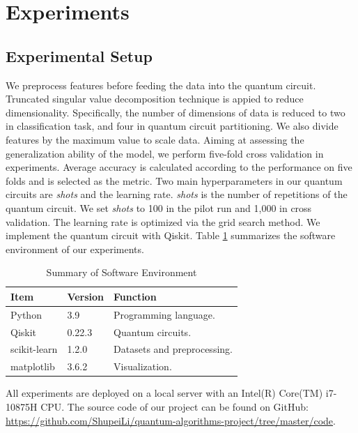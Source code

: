 \documentclass[sigconf]{acmart}
\begin{document}

\section{Experiments}
\subsection{Experimental Setup}
We preprocess features before feeding the data into the quantum circuit. Truncated singular value decomposition technique is appied to reduce dimensionality. Specifically, the number of dimensions of data is reduced to two in classification task, and four in quantum circuit partitioning. We also divide features by the maximum value to scale data. Aiming at assessing the generalization ability of the model, we perform five-fold cross validation in experiments. Average accuracy is calculated according to the performance on five folds and is selected as the metric. Two main hyperparameters in our quantum circuits are \textit{shots} and the learning rate. \textit{shots} is the number of repetitions of the quantum circuit. We set \textit{shots} to 100 in the pilot run and 1,000 in cross validation. The learning rate is optimized via the grid search method. We implement the quantum circuit with Qiskit. Table \ref{tab:software} summarizes the software environment of our experiments.

\begin{table}[!ht]
    \centering
    \caption{Summary of Software Environment}
    \label{tab:software}
    \begin{tabular}{lll}
        \toprule
        \textbf{Item} & \textbf{Version} & \textbf{Function}\\
        \midrule
        Python & 3.9 & Programming language.\\
        Qiskit & 0.22.3 & Quantum circuits.\\
        scikit-learn & 1.2.0 & Datasets and preprocessing.\\
        matplotlib & 3.6.2 & Visualization.\\
        \bottomrule
    \end{tabular}
\end{table}

All experiments are deployed on a local server with an Intel(R) Core(TM) i7-10875H CPU. The source code of our project can be found on GitHub: \url{https://github.com/ShupeiLi/quantum-algorithms-project/tree/master/code}.
\end{document}

